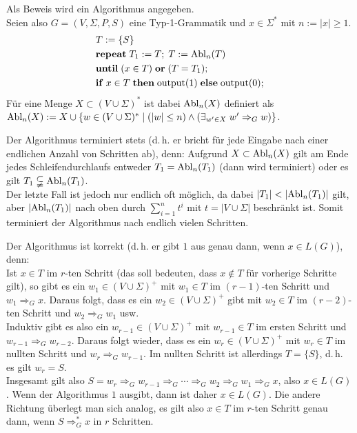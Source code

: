 \begin{Beweis}
    Als Beweis wird ein Algorithmus angegeben.\\
    Seien also $G = (V, \Sigma, P, S)$ eine Typ-1-Grammatik und
    $x \in \Sigma^\ast$ mit $n := |x| \ge 1$.
    \begin{align*}
        &T := \{S\}\\
        &\mathbf{repeat}\; T_1 := T;\; T := \text{Abl}_n(T)\\
        &\mathbf{until}\; (x \in T) \;\mathbf{or}\; (T = T_1);\\
        &\mathbf{if}\; x \in T \;\mathbf{then}\;
        \text{output}(1) \;\mathbf{else}\;
        \text{output}(0);
    \end{align*}
    Für eine Menge $X \subset (V \cup \Sigma)^\ast$ ist dabei
    $\text{Abl}_n(X)$ definiert als\\
    $\text{Abl}_n(X) := X \cup \{w \in (V \cup \Sigma)^\ast \;|\;
    (|w| \le n) \land (\exists_{w' \in X}\; w' \Rightarrow_G w)\}$.

    Der Algorithmus terminiert stets
    (d.\,h. er bricht für jede Eingabe nach einer
    endlichen Anzahl von Schritten ab), denn:
    Aufgrund $X \subset \text{Abl}_n(X)$ gilt am Ende jedes Schleifendurchlaufs
    entweder $T_1 = \text{Abl}_n(T_1)$ (dann wird terminiert) oder es gilt
    $T_1 \subsetneqq \text{Abl}_n(T_1)$.\\
    Der letzte Fall ist jedoch nur endlich oft möglich, da
    dabei $|T_1| < |\text{Abl}_n(T_1)|$ gilt, aber
    $|\text{Abl}_n(T_1)|$ nach oben durch $\sum_{i=1}^n t^i$ mit
    $t = |V \cup \Sigma|$ beschränkt ist.
    Somit terminiert der Algorithmus nach endlich vielen Schritten.

    Der Algorithmus ist korrekt
    (d.\,h. er gibt $1$ aus genau dann, wenn $x \in L(G)$), denn:\\
    Ist $x \in T$ im $r$-ten Schritt
    (das soll bedeuten, dass $x \notin T$ für vorherige Schritte gilt),
    so gibt es ein $w_1 \in (V \cup \Sigma)^+$ mit $w_1 \in T$
    im $(r - 1)$-ten Schritt und $w_1 \Rightarrow_G x$.
    Daraus folgt, dass es ein $w_2 \in (V \cup \Sigma)^+$ gibt mit $w_2 \in T$
    im $(r - 2)$-ten Schritt und $w_2 \Rightarrow_G w_1$ usw.\\
    Induktiv gibt es also ein $w_{r-1} \in (V \cup \Sigma)^+$ mit
    $w_{r-1} \in T$ im ersten Schritt und $w_{r-1} \Rightarrow_G w_{r-2}$.
    Daraus folgt wieder, dass es ein $w_r \in (V \cup \Sigma)^+$ mit
    $w_r \in T$ im nullten Schritt und $w_r \Rightarrow_G w_{r-1}$.
    Im nullten Schritt ist allerdings $T = \{S\}$, d.\,h. es gilt $w_r = S$.\\
    Insgesamt gilt also $S = w_r \Rightarrow_G w_{r-1} \Rightarrow_G \dotsb
    \Rightarrow_G w_2 \Rightarrow_G w_1 \Rightarrow_G x$, also
    $x \in L(G)$.
    Wenn der Algorithmus $1$ ausgibt, dann ist daher $x \in L(G)$.
    Die andere Richtung überlegt man sich analog, es gilt also
    $x \in T$ im $r$-ten Schritt genau dann, wenn $S \Rightarrow_G^\ast x$
    in $r$ Schritten.
\end{Beweis}

